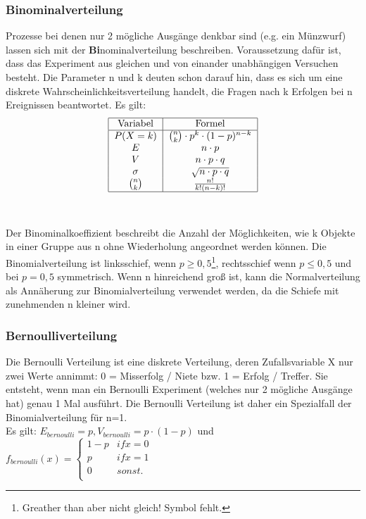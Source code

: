 \documentclass[letterpaper, titlepage]{article}
\begin{document}
\vspace{0.35cm}

\subsubsection{Binominalverteilung}\label{Binominalverteilung}
Prozesse bei denen nur 2 mögliche Ausgänge denkbar sind (e.g. ein Münzwurf) lassen sich mit der \textbf{Bi}nominalverteilung beschreiben. Voraussetzung dafür ist, dass das Experiment aus gleichen und von einander unabhängigen Versuchen besteht. Die Parameter n und k deuten schon darauf hin, dass es sich um eine diskrete Wahrscheinlichkeitsverteilung handelt, die Fragen nach k Erfolgen bei n Ereignissen beantwortet. Es gilt: 
\\
\begin{align}
    \begin{tabular}{|c|c|}
        \hline
        Variabel & Formel \\
        \hline
        $P(X=k)$ & $\binom{n}{k} \cdot p^k \cdot (1-p)^{n-k}$ \\
        $E$ & $n \cdot p$ \\
        $V$ & $n \cdot p \cdot q$ \\
        $\sigma$ & $\sqrt{n \cdot p \cdot q}$ \\
        $\binom{n}{k}$ & $\frac{n!}{k!(n-k)!}$ \\
        \hline
    \end{tabular}
\end{align}
\\
\\
Der Binominalkoeffizient beschreibt die Anzahl der Möglichkeiten, wie k Objekte in einer Gruppe aus n ohne Wiederholung angeordnet werden können. Die Binomialverteilung ist linksschief, wenn $p \geq 0,5$\footnote{Greather than aber nicht gleich! Symbol fehlt.}, rechtsschief wenn $p \leq 0,5$ und bei $p = 0,5$ symmetrisch. Wenn n hinreichend groß ist, kann die Normalverteilung als Annäherung zur Binomialverteilung verwendet werden, da die Schiefe mit zunehmenden n kleiner wird.

\vspace{0.35cm}

\subsubsection{Bernoulliverteilung}\label{Bernoulli}
Die Bernoulli Verteilung ist eine diskrete Verteilung, deren Zufallsvariable X nur zwei Werte annimmt: 0 = Misserfolg / Niete bzw. 1 = Erfolg / Treffer. Sie entsteht, wenn man ein Bernoulli Experiment (welches nur 2 mögliche Ausgänge hat) genau 1 Mal ausführt. Die Bernoulli Verteilung ist daher ein Spezialfall der Binomialverteilung für n=1. 
\\
Es gilt: $E_{bernoulli}=p, V_{bernoulli}=p\cdot (1-p)$ 
und $f_{bernoulli}(x)=\begin{cases}
    1-p & {if x=0} \\
    p & {if x=1} \\
    0 & {sonst.} \\
\end{cases}$
\end{document}
